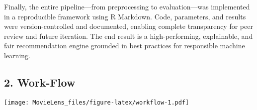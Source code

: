 \documentclass[
]{article}
\begin{document}
Finally, the entire pipeline---from preprocessing to evaluation---was
implemented in a reproducible framework using R Markdown. Code,
parameters, and results were version-controlled and documented, enabling
complete transparency for peer review and future iteration. The end
result is a high-performing, explainable, and fair recommendation engine
grounded in best practices for responsible machine learning.

\subsection{2. Work-Flow}\label{work-flow}

\texttt{[image: MovieLens\_files/figure-latex/workflow-1.pdf]}
\end{document}
